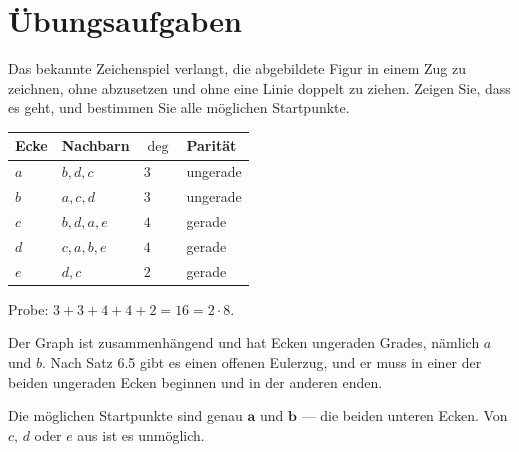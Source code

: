 \section{Übungsaufgaben}

\begin{aufgabe}
Das bekannte Zeichenspiel verlangt, die abgebildete Figur in einem Zug zu zeichnen, ohne abzusetzen und ohne eine Linie doppelt zu ziehen. Zeigen Sie, dass es geht, und bestimmen Sie alle möglichen Startpunkte.

\begin{center}
\end{center}

\loesung
{}
\begin{center}
\renewcommand{\arraystretch}{1.42}
\begin{tabular}{@{}P{1.2cm}P{3.4cm}P{1.4cm}P{1.6cm}@{}}
\toprule
\textbf{Ecke} & \textbf{Nachbarn} & $\deg$ & \textbf{Parität}\\
\midrule
$a$ & $b, d, c$ & $3$ & \textcolor{akzent}{ungerade}\\
$b$ & $a, c, d$ & $3$ & \textcolor{akzent}{ungerade}\\
$c$ & $b, d, a, e$ & $4$ & gerade\\
$d$ & $c, a, b, e$ & $4$ & gerade\\
$e$ & $d, c$ & $2$ & gerade\\
\bottomrule
\end{tabular}
\end{center}
Probe: $3+3+4+4+2 = 16 = 2 \cdot 8$. \checkmark

Der Graph ist zusammenhängend und hat  Ecken ungeraden Grades, nämlich $a$ und $b$. Nach Satz 6.5 gibt es einen offenen Eulerzug, und er muss in einer der beiden ungeraden Ecken beginnen und in der anderen enden.

Die möglichen Startpunkte sind genau $\mathbf{a}$ und $\mathbf{b}$ --- die beiden unteren Ecken. Von $c$, $d$ oder $e$ aus ist es unmöglich.


\end{aufgabe}
